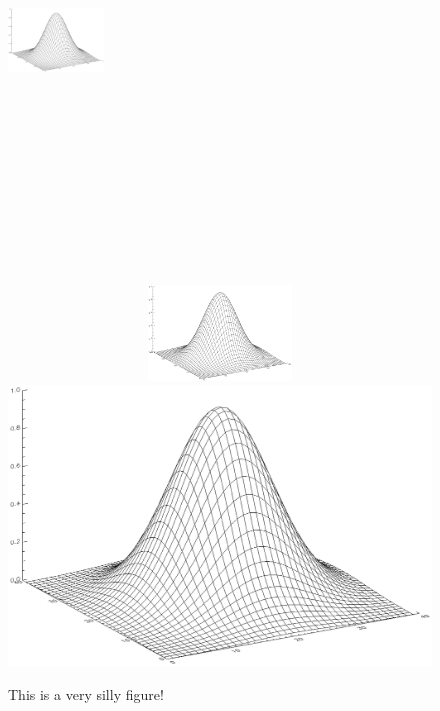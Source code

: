 \documentclass[12pt,preprint]{aastex}
\begin{document}
\begin{figure} [!p]
\begin{center}
\includegraphics[width=1in,height=5in]{2dgaussian.ps}
\includegraphics[width=5in,height=1in,angle=180]{2dgaussian.ps}
\includegraphics[scale=0.1,angle=45]{2dgaussian.ps}
\end{center}
\caption{This is a very silly figure! \label{silly}}
\end{figure}
\end{document}
